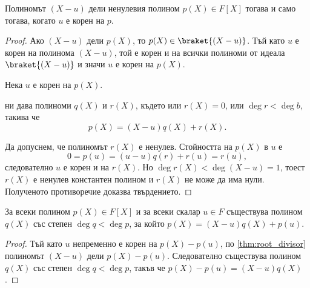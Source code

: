 \documentclass{../../common/topic}
\begin{document}
\begin{proposition}\label{thm:root_divisor}
  Полиномът \( (X - u) \) дели ненулевия полином \( p(X) \in F[X] \) тогава и само тогава, когато \( u \) е корен на \( p \).
\end{proposition}
\begin{proof}
  \SufficiencySubProof Ако \( (X - u) \) дели \( p(X) \), то \( p(X) \in \braket{(X - u)} \). Тъй като \( u \) е корен на полинома \( (X - u) \), той е корен и на всички полиноми от идеала \( \braket{(X - u)} \) и значи \( u \) е корен на \( p(X) \).

  \NecessitySubProof Нека \( u \) е корен на \( p(X) \).

   ни дава полиноми \( q(X) \) и \( r(X) \), където или \( r(X) = 0 \), или \( \deg r < \deg b \), такива че
  \begin{equation*}
    p(X) = (X - u) q(X) + r(X).
  \end{equation*}

  Да допуснем, че полиномът \( r(X) \) е ненулев. Стойността на \( p(X) \) в \( u \) е
  \begin{equation*}
    0 = p(u) = (u - u) q(r) + r(u) = r(u),
  \end{equation*}
  следователно \( u \) е корен и на \( r(X) \). Но \( \deg r(X) < \deg (X - u) = 1 \), тоест \( r(X) \) е ненулев константен полином и \( r(X) \) не може да има нули. Полученото противоречие доказва твърдението.
\end{proof}

\begin{proposition}\label{thm:root_inexact_divisor}
  За всеки полином \( p(X) \in F[X] \) и за всеки скалар \( u \in F \) съществува полином \( q(X) \) със степен \( \deg q < \deg p \), за който \( p(X) = (X - u) q(X) + p(u) \).
\end{proposition}
\begin{proof}
  Тъй като \( u \) непременно е корен на \( p(X) - p(u) \), по \cref{thm:root_divisor} полиномът \( (X - u) \) дели \( p(X) - p(u) \). Следователно съществува полином \( q(X) \) със степен \( \deg q < \deg p \), такъв че \( p(X) - p(u) = (X - u) q(X) \).
\end{proof}
\end{document}
